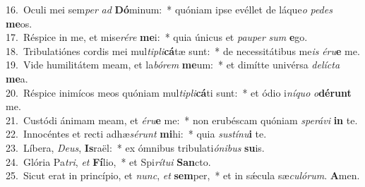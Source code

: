 {16.~}Oculi mei sem\textit{per} \textit{ad} \textbf{Dó}minum:~* quóniam ipse evéllet de láque\textit{o} \textit{pe}\textit{des} \textbf{me}os.\\
{17.~}Réspice in me, et mise\textit{ré}\textit{re} \textbf{me}i:~* quia únicus et \textit{pau}\textit{per} \textit{sum} \textbf{e}go.\\
{18.~}Tribulatiónes cordis mei mul\textit{ti}\textit{pli}\textbf{cá}tæ sunt:~* de necessitátibus me\textit{is} \textit{é}\textit{ru}\textbf{e} me.\\
{19.~}Vide humilitátem meam, et la\textit{bó}\textit{rem} \textbf{me}um:~* et dimítte univérsa \textit{de}\textit{lí}\textit{cta} \textbf{me}a.\\
{20.~}Réspice inimícos meos quóniam mul\textit{ti}\textit{pli}\textbf{cá}ti sunt:~* et ódio i\textit{ní}\textit{quo} \textit{o}\textbf{dé}\textbf{runt} me.\\
{21.~}Custódi ánimam meam, et \textit{é}\textit{ru}\textbf{e} me:~* non erubéscam quóniam \textit{spe}\textit{rá}\textit{vi} \textbf{in} te.\\
{22.~}Innocéntes et recti adhæ\textit{sé}\textit{runt} \textbf{mi}hi:~* quia \textit{su}\textit{stí}\textit{nu}\textbf{i} te.\\
{23.~}Líbera, \textit{De}\textit{us}, \textbf{Is}raël:~* ex ómnibus tribulati\textit{ó}\textit{ni}\textit{bus} \textbf{su}is.\\
{24.~}Glória Pa\textit{tri}, \textit{et} \textbf{Fí}lio,~* et Spi\textit{rí}\textit{tu}\textit{i} \textbf{San}cto.\\
{25.~}Sicut erat in princípio, et \textit{nunc}, \textit{et} \textbf{sem}per,~* et in sǽcula sæ\textit{cu}\textit{ló}\textit{rum}. \textbf{A}men.\\
